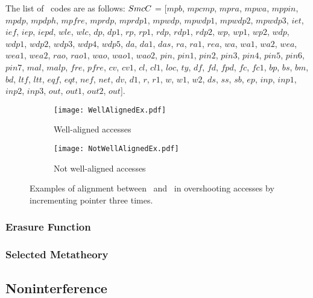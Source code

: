 The list of \piccoC\ codes are as follows: 
$SmcC$ = 
	[$\mathit{mpb}$, $\mathit{mpcmp}$, 
	$\mathit{mpra}$, $\mathit{mpwa}$, $\mathit{mppin}$, $\mathit{mpdp}$, $\mathit{mpdph}$, 
	$\mathit{mpfre}$, 
	$\mathit{mprdp}$, $\mathit{mprdp1}$, 
	$\mathit{mpwdp}$, $\mathit{mpwdp1}$, $\mathit{mpwdp2}$, $\mathit{mpwdp3}$, 
	$\mathit{iet}$, $\mathit{ief}$, $\mathit{iep}$, $\mathit{iepd}$, $\mathit{wle}$, $\mathit{wlc}$, 
	$\mathit{dp}$, $\mathit{dp1}$, 
	$\mathit{rp}$, $\mathit{rp1}$, $\mathit{rdp}$, $\mathit{rdp1}$, $\mathit{rdp2}$, 
	$\mathit{wp}$, $\mathit{wp1}$, $\mathit{wp2}$, 
	$\mathit{wdp}$, $\mathit{wdp1}$, $\mathit{wdp2}$, $\mathit{wdp3}$, $\mathit{wdp4}$, $\mathit{wdp5}$, 
	$\mathit{da}$, $\mathit{da1}$, $\mathit{das}$, 
	$\mathit{ra}$, $\mathit{ra1}$, $\mathit{rea}$, 
	$\mathit{wa}$, $\mathit{wa1}$, $\mathit{wa2}$, 
	$\mathit{wea}$, $\mathit{wea1}$, $\mathit{wea2}$, 
	$\mathit{rao}$, $\mathit{rao1}$, 
	$\mathit{wao}$, $\mathit{wao1}$, $\mathit{wao2}$, 
	$\mathit{pin}$, $\mathit{pin1}$, $\mathit{pin2}$, $\mathit{pin3}$, $\mathit{pin4}$, 
	$\mathit{pin5}$, $\mathit{pin6}$, $\mathit{pin7}$, 
	$\mathit{mal}$, $\mathit{malp}$, $\mathit{fre}$, $\mathit{pfre}$, 
	$\mathit{cv}$, $\mathit{cv1}$, $\mathit{cl}$, $\mathit{cl1}$, 
	$\mathit{loc}$, $\mathit{ty}$, 
	$\mathit{df}$, $\mathit{fd}$, $\mathit{fpd}$, $\mathit{fc}$, $\mathit{fc1}$, 
	$\mathit{bp}$, $\mathit{bs}$, $\mathit{bm}$, $\mathit{bd}$, 
	$\mathit{ltf}$, $\mathit{ltt}$, $\mathit{eqf}$, $\mathit{eqt}$, $\mathit{nef}$, $\mathit{net}$, 
	$\mathit{dv}$, $\mathit{d1}$, $\mathit{r}$, $\mathit{r1}$, $\mathit{w}$, $\mathit{w1}$, $\mathit{w2}$, 
	$\mathit{ds}$, $\mathit{ss}$, $\mathit{sb}$, $\mathit{ep}$, 
	$\mathit{inp}$, $\mathit{inp1}$, $\mathit{inp2}$, $\mathit{inp3}$, 
	$\mathit{out}$, $\mathit{out1}$, $\mathit{out2}$, $\mathit{out}$]. 







\begin{figure*}[h]
\begin{subfigure}{0.55\textwidth}
\texttt{[image: WellAlignedEx.pdf]}
\caption{Well-aligned accesses}
\label{fig: well-aligned}
\end{subfigure}
\quad
\begin{subfigure}{0.35\textwidth}
\texttt{[image: NotWellAlignedEx.pdf]}
\caption{Not well-aligned accesses}
\label{fig: not well-aligned}
\end{subfigure}
\caption{Examples of alignment between \piccoC\ and \vanillaC\ in overshooting accesses by incrementing pointer  three times.}
\label{fig: overshooting alignment}
\end{figure*}

\subsubsection{Erasure Function}


\subsubsection{Selected Metatheory}


\subsection{Noninterference}
\label{app: noninterference}



